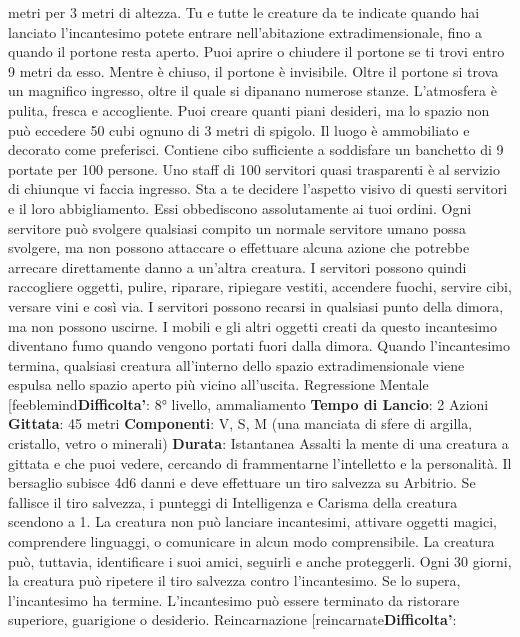 \begin{multicols}{2}
metri per 3 metri di altezza. Tu e tutte le creature da te
indicate quando hai lanciato l’incantesimo potete
entrare nell’abitazione extradimensionale, fino a quando
il portone resta aperto. Puoi aprire o chiudere il portone
se ti trovi entro 9 metri da esso. Mentre è chiuso, il
portone è invisibile.
Oltre il portone si trova un magnifico ingresso, oltre il
quale si dipanano numerose stanze. L’atmosfera è
pulita, fresca e accogliente.
Puoi creare quanti piani desideri, ma lo spazio non può
eccedere 50 cubi ognuno di 3 metri di spigolo. Il luogo è
ammobiliato e decorato come preferisci. Contiene cibo
sufficiente a soddisfare un banchetto di 9 portate per
100 persone. Uno staff di 100 servitori quasi trasparenti
è al servizio di chiunque vi faccia ingresso. Sta a te
decidere l’aspetto visivo di questi servitori e il loro
abbigliamento. Essi obbediscono assolutamente ai tuoi
ordini. Ogni servitore può svolgere qualsiasi compito un
normale servitore umano possa svolgere, ma non
possono attaccare o effettuare alcuna azione che
potrebbe arrecare direttamente danno a un’altra
creatura. I servitori possono quindi raccogliere oggetti,
pulire, riparare, ripiegare vestiti, accendere fuochi,
servire cibi, versare vini e così via. I servitori possono
recarsi in qualsiasi punto della dimora, ma non possono
uscirne. I mobili e gli altri oggetti creati da questo
incantesimo diventano fumo quando vengono portati
fuori dalla dimora. Quando l’incantesimo termina,
qualsiasi creatura all’interno dello spazio
extradimensionale viene espulsa nello spazio aperto più
vicino all’uscita.
Regressione Mentale
[feeblemind\textbf{Difficolta'}:
8° livello, ammaliamento
\textbf{Tempo di Lancio}: 2 Azioni
\textbf{Gittata}: 45 metri
\textbf{Componenti}: V, S, M (una manciata di sfere di argilla,
cristallo, vetro o minerali)
\textbf{Durata}: Istantanea
Assalti la mente di una creatura a gittata e che puoi
vedere, cercando di frammentarne l’intelletto e la
personalità. Il bersaglio subisce 4d6 danni e
deve effettuare un tiro salvezza su Arbitrio.
Se fallisce il tiro salvezza, i punteggi di Intelligenza e
Carisma della creatura scendono a 1. La creatura non
può lanciare incantesimi, attivare oggetti magici,
comprendere linguaggi, o comunicare in alcun modo
comprensibile. La creatura può, tuttavia, identificare i
suoi amici, seguirli e anche proteggerli.
Ogni 30 giorni, la creatura può ripetere il tiro salvezza
contro l’incantesimo. Se lo supera, l’incantesimo ha
termine.
L’incantesimo può essere terminato da ristorare
superiore, guarigione o desiderio.
Reincarnazione
[reincarnate\textbf{Difficolta'}:

\end{multicols}
